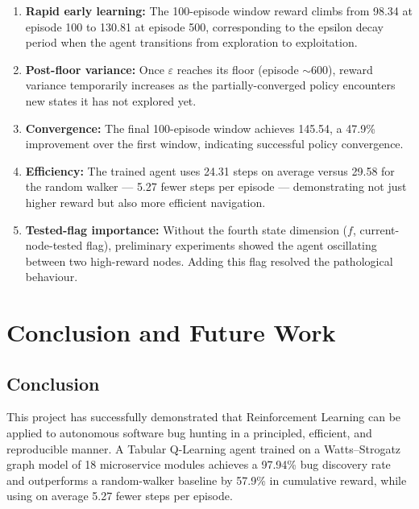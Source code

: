 \documentclass[12pt,a4paper]{report}
\begin{document}
\begin{enumerate}[leftmargin=1.5em]
  \item \textbf{Rapid early learning:} The 100-episode window reward
        climbs from 98.34 at episode 100 to 130.81 at episode 500,
        corresponding to the epsilon decay period when the agent
        transitions from exploration to exploitation.

  \item \textbf{Post-floor variance:} Once $\varepsilon$ reaches its
        floor (episode $\sim$600), reward variance temporarily increases
        as the partially-converged policy encounters new states it has
        not explored yet.

  \item \textbf{Convergence:} The final 100-episode window achieves
        145.54, a 47.9\% improvement over the first window, indicating
        successful policy convergence.

  \item \textbf{Efficiency:} The trained agent uses 24.31 steps on
        average versus 29.58 for the random walker --- 5.27 fewer
        steps per episode --- demonstrating not just higher reward but
        also more efficient navigation.

  \item \textbf{Tested-flag importance:} Without the fourth state
        dimension ($f$, current-node-tested flag), preliminary
        experiments showed the agent oscillating between two high-reward
        nodes.  Adding this flag resolved the pathological behaviour.
\end{enumerate}

\chapter*{Conclusion and Future Work}

\section*{Conclusion}

This project has successfully demonstrated that Reinforcement Learning
can be applied to autonomous software bug hunting in a principled,
efficient, and reproducible manner.  A Tabular Q-Learning agent trained
on a Watts--Strogatz graph model of 18 microservice modules achieves a
97.94\% bug discovery rate and outperforms a random-walker baseline by
57.9\% in cumulative reward, while using on average 5.27 fewer steps
per episode.
\end{document}
